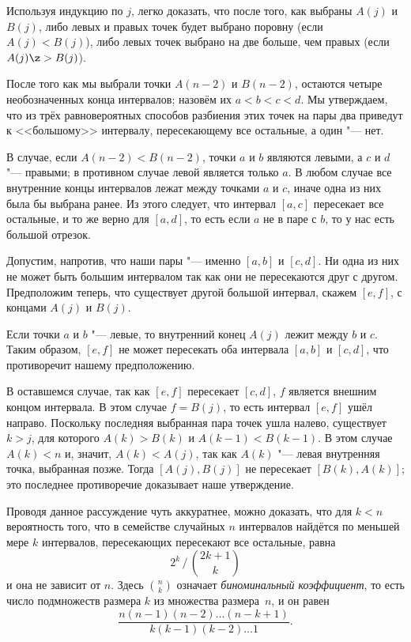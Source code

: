 \documentclass[twoside]{book}
\begin{document}
Используя индукцию по $j$, легко доказать, что после того, как выбраны
$A(j)$ и $B(j)$, либо левых и правых точек будет выбрано
поровну (если $A(j) < B(j)$), либо левых точек выбрано на
две больше, чем правых (если $A(j) \z> B(j)$).

После того как мы выбрали точки $A(n-2)$ и $B(n-2)$, остаются четыре
необозначенных конца интервалов; назовём их $a<b<c<d$.
Мы утверждаем, что из трёх равновероятных способов разбиения этих точек на пары два приведут к <<большому>> интервалу, пересекающему все остальные, а один "--- нет.

В случае, если $A(n-2) < B(n-2)$, точки $a$ и $b$ являются левыми, а $c$ и $d$ "--- правыми;
в противном случае левой является только $a$.
В любом случае все внутренние концы интервалов лежат между точками $a$
и $c$, иначе одна из них была бы выбрана ранее.
Из этого следует, что интервал $[a,c]$ пересекает все остальные, и то же верно для $[a,d]$, то есть если $a$ не в паре с $b$, то у нас есть большой отрезок.

Допустим, напротив, что наши пары "--- именно $[a, b]$ и $[c, d]$.
Ни одна из них не может быть большим интервалом так как они не пересекаются друг с другом.
Предположим теперь, что существует другой большой интервал, скажем $[e,f]$, с концами $A(j)$ и $B(j)$.

Если точки $a$ и $b$ "--- левые, то внутренний конец $A(j)$ лежит между $b$ и $c$.
Таким образом, $[e, f]$ не может пересекать оба интервала $[a, b]$ и $[c, d]$, что противоречит нашему предположению.

В оставшемся случае, так как $[e, f]$ пересекает $[c, d]$, $f$ является внешним концом интервала. 
В этом случае $f=B(j)$, то есть интервал $[e, f]$ ушёл направо.
Поскольку последняя выбранная пара точек ушла налево, существует $k>j$, для которого $A(k)>B(k)$ и $A(k-1)<B(k-1)$.
В этом случае $A(k)<n$ и, значит, $A(k) < A(j)$, так как $A(k)$ "--- левая внутренняя точка, выбранная позже. %
Тогда $[A(j), B(j)]$ не пересекает $[B(k), A(k)]$; это последнее противоречие доказывает наше утверждение.
\heart

Проводя данное рассуждение чуть аккуратнее, можно доказать, что 
для $k < n$ вероятность того, что в семействе случайных $n$ интервалов
найдётся по меньшей мере $k$ интервалов, пересекающих пересекают все остальные, равна
\[{2^k}\,\big/\,{\binom{2k+1} k}\]
и она не зависит от $n$.
Здесь $\binom n k$ означает \emph{биноминальный коэффициент}, то есть число подмножеств размера $k$ из множества размера~$n$, и он равен
\[\frac{n(n-1)(n-2)\ldots(n-k+1)}{k(k-1)(k-2)\ldots 1}.\]
\end{document}
